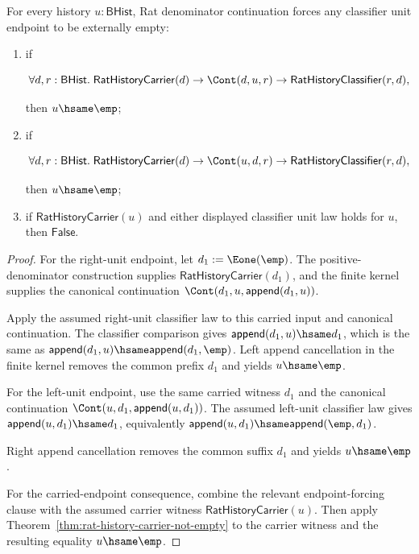 \begin{theorem}
\label{thm:field-rat-denominator-continuation-unit-endpoint-empty}
For every history $u:\mathsf{BHist}$, Rat denominator continuation forces any
classifier unit endpoint to be externally empty:
\begin{enumerate}
  \item if

  $$
  \forall d,r:\mathsf{BHist}.\;
  \mathsf{RatHistoryCarrier}(d)\to
  \Cont(d,u,r)\to
  \mathsf{RatHistoryClassifier}(r,d),
  $$

  then $u\hsame\emp$;
  \item if

  $$
  \forall d,r:\mathsf{BHist}.\;
  \mathsf{RatHistoryCarrier}(d)\to
  \Cont(u,d,r)\to
  \mathsf{RatHistoryClassifier}(r,d),
  $$

  then $u\hsame\emp$;
  \item if $\mathsf{RatHistoryCarrier}(u)$ and either displayed classifier
  unit law holds for $u$, then $\mathsf{False}$.
\end{enumerate}
\end{theorem}
\begin{proof}
For the right-unit endpoint, let $d_1:=\Eone(\emp)$. The positive-denominator
construction supplies $\mathsf{RatHistoryCarrier}(d_1)$, and the finite kernel
supplies the canonical continuation
$\Cont(d_1,u,\mathsf{append}(d_1,u))$.

Apply the assumed right-unit classifier law to this carried input and canonical
continuation. The classifier comparison gives
$\mathsf{append}(d_1,u)\hsame d_1$, which is the same as
$\mathsf{append}(d_1,u)\hsame\mathsf{append}(d_1,\emp)$. Left append
cancellation in the finite kernel removes the common prefix $d_1$ and yields
$u\hsame\emp$.

For the left-unit endpoint, use the same carried witness $d_1$ and the
canonical continuation $\Cont(u,d_1,\mathsf{append}(u,d_1))$. The assumed
left-unit classifier law gives
$\mathsf{append}(u,d_1)\hsame d_1$, equivalently
$\mathsf{append}(u,d_1)\hsame\mathsf{append}(\emp,d_1)$.

Right append cancellation removes the common suffix $d_1$ and yields
$u\hsame\emp$.

For the carried-endpoint consequence, combine the relevant endpoint-forcing
clause with the assumed carrier witness $\mathsf{RatHistoryCarrier}(u)$. Then
apply Theorem~\ref{thm:rat-history-carrier-not-empty} to the carrier witness
and the resulting equality $u\hsame\emp$.
\end{proof}

